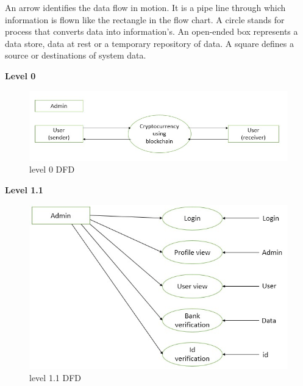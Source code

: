 \documentclass[12pt]{article}
\begin{document}
\newpage

\par An arrow identifies the data flow in motion. It is a pipe line through which
information is flown like the rectangle in the flow chart. A circle stands for process that
converts data into information's. An open-ended box represents a data store, data at rest
or a temporary repository of data. A square defines a source or destinations of system
data.

\begin{flushleft}\textbf{Level 0}\end{flushleft}


\begin{figure}[h!]
\begin{center}
\includegraphics[scale=.9]{DFD1.0}
\caption{level 0 DFD}
\end{center}
\end{figure}
\newpage

\begin{flushleft}\textbf{Level 1.1}\end{flushleft}


\begin{figure}[h!]
\begin{center}
\includegraphics[scale=.9]{DFD1.1}
\caption{ level 1.1 DFD}
\end{center}
\end{figure}
\newpage
\end{document}
